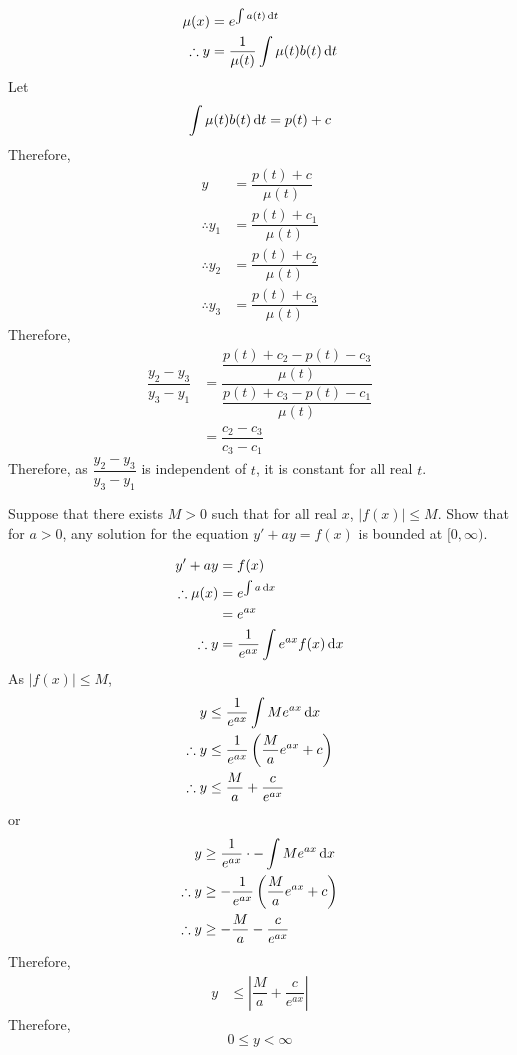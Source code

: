 \documentclass[fleqn, a4paper, 12pt, oneside]{amsart}
\theoremstyle{definition}
\theoremstyle{theorem}
\begin{document}
\begin{solution}
	\begin{align*}
		\mu(x) &= e^{\int a(t) \dif t}\\
		\therefore y &= \dfrac{1}{\mu(t)} \int \mu(t) b(t) \dif t
	\end{align*}
	Let 
	\begin{align*}
		\int \mu(t) b(t) \dif t = p(t) + c
	\end{align*}
	Therefore,
	\begin{align*}
		y &= \dfrac{p(t) + c}{\mu(t)}\\
		\therefore y_1 &= \dfrac{p(t) + c_1}{\mu(t)}\\
		\therefore y_2 &= \dfrac{p(t) + c_2}{\mu(t)}\\
		\therefore y_3 &= \dfrac{p(t) + c_3}{\mu(t)}
	\end{align*}
	Therefore,
	\begin{align*}
		\dfrac{y_2 - y_3}{y_3 - y_1} &= \dfrac{\dfrac{p(t) + c_2 - p(t) - c_3}{\mu(t)}}{\dfrac{p(t) + c_3 - p(t) - c_1}{\mu(t)}}\\
		&= \dfrac{c_2 - c_3}{c_3 - c_1}
	\end{align*}
	Therefore, as $\dfrac{y_2 - y_3}{y_3 - y_1}$ is independent of $t$, it is constant for all real $t$.
\end{solution}

\begin{question}
	Suppose that there exists $M > 0$ such that for all real $x$, $|f(x)| \le M$.
	Show that for $a > 0$, any solution for the equation $y' + ay = f(x)$ is bounded at $[0, \infty)$.
\end{question}

\begin{solution}
	\begin{align*}
		y' + ay &= f(x)\\
		\therefore \mu(x) &= e^{\int a \dif x}\\
		&= e^{a x}\\
		\therefore y &= \dfrac{1}{e^{a x}} \int e^{a x} f(x) \dif x
	\end{align*}
	As $|f(x)| \le M$,
	\begin{align*}
		y &\le \dfrac{1}{e^{a x}} \int M e^{a x} \dif x\\
		\therefore y &\le \dfrac{1}{e^{a x}} \left( \dfrac{M}{a} e^{a x} + c \right)\\
		\therefore y &\le \dfrac{M}{a} + \dfrac{c}{e^{a x}}
	\end{align*}
	or
	\begin{align*}
		y &\ge \dfrac{1}{e^{a x}} \cdot -\int M e^{a x} \dif x\\
		\therefore y &\ge -\dfrac{1}{e^{a x}} \left( \dfrac{M}{a} e^{a x} + c \right)\\
		\therefore y &\ge -\dfrac{M}{a} - \dfrac{c}{e^{a x}}
	\end{align*}
	Therefore,
	\begin{align*}
		y &\le \left| \dfrac{M}{a} + \dfrac{c}{e^{a x}} \right|
	\end{align*}
	Therefore,
	\begin{equation*}
		0 \le y < \infty
	\end{equation*}
\end{solution}
\end{document}
